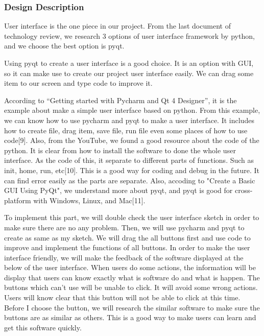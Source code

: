 \documentclass [10pt]{article}
\begin{document}
\subsubsection{Design Description}
User interface is the one piece in our project. From the last document of technology review, we research 3 options of user interface framework by python, and we choose the best option is pyqt. \par
Using pyqt to create a user interface is a good choice. It is an option with GUI, so it can make use to create our project user interface easily. We can drag some item to our screen and type code to improve it. \par
According to “Getting started with Pycharm and Qt 4 Designer”, it is the example about make a simple user interface based on python. From this example, we can know how to use pycharm and pyqt to make a user interface. It includes how to create file, drag item, save file, run file even some places of how to use code[9]. Also, from the YouTube, we found a good resource about the code of the python. It is clear from how to install the software to done the whole user interface. As the code of this, it separate to different parts of functions. Such as init, home, run, etc[10]. This is a good way for coding and debug in the future. It can find error easily as the parts are separate. Also, accoding to "Create a Basic GUI Using PyQt", we understand more about pyqt, and pyqt is good for cross-platform with Windows, Linux, and Mac[11]. \par
To implement this part, we will double check the user interface sketch in order to make sure there are no any problem. Then, we will use pycharm and pyqt to create as same as my sketch. We will drag the all buttons first and use code to improve and implement the functions of all buttons. In order to make the user interface friendly, we will make the feedback of the software displayed at the below of the user interface. When users do some actions, the information will be display that users can know exactly what is software do and what is happen. The buttons which can’t use will be unable to click. It will avoid some wrong actions. Users will know clear that this button will not be able to click at this time. Before I choose the button, we will research the similar software to make sure the buttons are as similar as others. This is a good way to make users can learn and get this software quickly. \par
\end{document}
